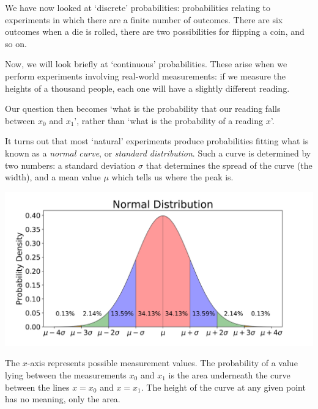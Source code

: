 
\usepackage[normalem]{ulem}
\usepackage{venndiagram}





We have now looked at `discrete' probabilities: probabilities relating to experiments
in which there are a finite number of outcomes. There are six outcomes when a die
is rolled, there are two possibilities for flipping a coin, and so on.

Now, we will look briefly at `continuous' probabilities. These arise when we perform
experiments involving real-world measurements: if we measure the heights of a thousand
people, each one will have a slightly different reading.

Our question then becomes `what is the probability that our reading falls between $ x_0 $
and $ x_1 $', rather than `what is the probability of a reading $ x $'.

It turns out that most `natural' experiments produce probabilities fitting what is
known as a \emph{normal curve}, or \emph{standard distribution}. Such a curve is
determined by two numbers: a standard deviation $ \sigma $ that determines the spread
of the curve (the width), and a mean value $ \mu $ which tells us where the peak is.

\begin{center}
  \includegraphics[width=\textwidth]{norml}
\end{center}

The $ x$-axis represents possible measurement values. The probability of a value lying
between the measurements $ x_0 $ and $ x_1 $ is the area underneath the curve between
the lines $ x = x_0 $ and $ x = x_1 $. The height of the curve at any given point has no
meaning, only the area.

